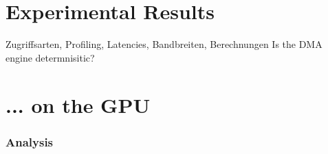 \section{Experimental Results} %
\label{sec:experimental_results}


Zugriffsarten, Profiling, Latencies, Bandbreiten, Berechnungen
Is the DMA engine determnisitic?


\section{... on the GPU} %
\label{sec:_on_the_gpu}
\subsubsection{Analysis} %



